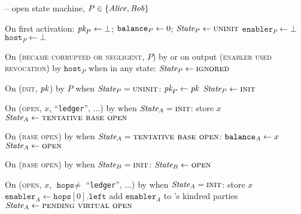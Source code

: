 \begin{center}
  \begin{systembox}{\fchan{} -- open state machine, $P \in \{\mathit{Alice}, \mathit{Bob}\}$}
    \begin{algorithmic}[1]
      \State On first activation: 
      \label{code:functionality:open:boot}
      \Indent
        \State $\textit{pk}_{P} \gets \bot$; $\texttt{balance}_{P} \gets 0$; $\itistate_P \gets
        \textsc{uninit}$
        \State $\texttt{enabler}_P \gets \bot$ 
        \State $\texttt{host}_P \gets \bot$ 
      \EndIndent
      \Statex

      \State On (\textsc{became corrupted or negligent}, $P$) by \adversary or
      on output (\textsc{enabler used revocation}) by $\texttt{host}_P$ when in
      any state:
      \label{code:functionality:open:when-ignored}
      \Indent
        \State $\itistate_P \gets \textsc{ignored}$
      \EndIndent
      \Statex

      \State On (\textsc{init}, $\textit{pk}_{}$) by $P$ when
      $\itistate_P = \textsc{uninit}$:
      \Indent
        \State $\textit{pk}_{P} \gets \textit{pk}_{}$
        \State $\itistate_P \gets \textsc{init}$
      \EndIndent
      \Statex

      \State On (\textsc{open}, $x$, ``\texttt{ledger}'', $\dots$) by \alice
      when $\itistate_A = \textsc{init}$:
      \Indent
        \State store $x$
        \label{code:functionality:open:store}
        \State $\itistate_A \gets \textsc{tentative base open}$
      \EndIndent
      \Statex

      \State On (\textsc{base open}) by \adversary when $\itistate_A =
      \textsc{tentative base open}$:
      \Indent
        \State $\texttt{balance}_{A} \gets x$
        \label{code:functionality:open:base-balance}
        \State $\itistate_A \gets \textsc{open}$
      \EndIndent
      \Statex

      \State On (\textsc{base open}) by \adversary when $\itistate_B =
      \textsc{init}$:
      \label{code:functionality:open:when-open-bob}
      \Indent
        \State $\itistate_B \gets \textsc{open}$
      \EndIndent
      \Statex

      \State On (\textsc{open}, $x$, $\texttt{hops} \neq$ ``\texttt{ledger}'',
      $\dots$) by \alice when $\itistate_A = \textsc{init}$:
      \Indent
        \State store $x$
        \State $\texttt{enabler}_A \gets \texttt{hops}[0].\texttt{left}$
        \State add $\texttt{enabler}_A$ to \alice's kindred parties
        \State $\itistate_A \gets \textsc{pending virtual open}$
      \EndIndent
      \Statex


\end{algorithmic}
\end{systembox}
\end{center}
